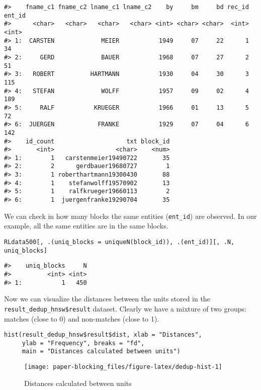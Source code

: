 \begin{verbatim}
#>    fname_c1 fname_c2 lname_c1 lname_c2    by     bm     bd rec_id ent_id
#>      <char>   <char>   <char>   <char> <int> <char> <char>  <int>  <int>
#> 1:  CARSTEN             MEIER           1949     07     22      1     34
#> 2:     GERD             BAUER           1968     07     27      2     51
#> 3:   ROBERT          HARTMANN           1930     04     30      3    115
#> 4:   STEFAN             WOLFF           1957     09     02      4    189
#> 5:     RALF           KRUEGER           1966     01     13      5     72
#> 6:  JUERGEN            FRANKE           1929     07     04      6    142
#>    id_count                    txt block_id
#>       <int>                 <char>    <num>
#> 1:        1   carstenmeier19490722       35
#> 2:        2      gerdbauer19680727        1
#> 3:        1 roberthartmann19300430       88
#> 4:        1    stefanwolff19570902       13
#> 5:        1    ralfkrueger19660113        2
#> 6:        1  juergenfranke19290704       35
\end{verbatim}

We can check in how many blocks the same entities (\texttt{ent\_id}) are
observed. In our example, all the same entities are in the same blocks.

\begin{verbatim}
RLdata500[, .(uniq_blocks = uniqueN(block_id)), .(ent_id)][, .N, uniq_blocks]
\end{verbatim}

\begin{verbatim}
#>    uniq_blocks     N
#>          <int> <int>
#> 1:           1   450
\end{verbatim}

Now we can visualize the distances between the units stored in the
\linebreak \texttt{result\_dedup\_hnsw\$result} dataset. Clearly we have a mixture
of two groups: matches (close to 0) and non-matches (close to 1).

\begin{verbatim}
hist(result_dedup_hnsw$result$dist, xlab = "Distances",
     ylab = "Frequency", breaks = "fd",
     main = "Distances calculated between units")
\end{verbatim}

\begin{figure}[H]

{\centering \texttt{[image: paper-blocking\_files/figure-latex/dedup-hist-1]} 

}

\caption{Distances calculated between units}\label{fig:dedup-hist}
\end{figure}

